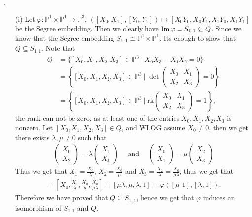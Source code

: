 \documentclass[12pt]{article}
\begin{document}
    \sol.
    \begin{enumerate}
        \item[(i)] Let $\varphi : \mathbb{P}^1 \times \mathbb{P}^1 \to \mathbb{P}^3$, $([X_0,X_1],[Y_0,Y_1]) \mapsto [X_0Y_0, X_0Y_1, X_1Y_0, X_1Y_1]$ be the Segree embedding. Then we clearly have $\operatorname{Im} \varphi = S_{1,1} \subseteq Q$. Since we know that the Segree embedding $S_{1,1} \cong \mathbb{P}^1 \times \mathbb{P}^1$. Its enough to show that $Q \subseteq S_{1,1}$. Note that 
        \begin{align*}
            Q &= \{ [X_0,X_1,X_2,X_3] \in \mathbb{P}^3 \mid X_0X_3 - X_1X_2 = 0 \} \\
            &= \left\{ [X_0,X_1,X_2,X_3] \in \mathbb{P}^3 \mid \det\begin{pmatrix} X_0 & X_1 \\ X_2 & X_3 \end{pmatrix} = 0\right\} \\ 
            &= \left\{ [X_0,X_1,X_2,X_3] \in \mathbb{P}^3 \mid \mathrm{rk}\begin{pmatrix} X_0 & X_1 \\ X_2 & X_3 \end{pmatrix} = 1 \right\},
        \end{align*}
        the rank can not be zero, as at least one of the entries $X_0, X_1, X_2, X_3$ is nonzero. Let $[X_0,X_1,X_2,X_3] \in Q$, and WLOG assume $X_0 \neq 0$, then we get there exists $\lambda, \mu \neq 0$ such that 
        \begin{align*}
            \begin{pmatrix}
                X_0 \\ X_2
            \end{pmatrix} = \lambda \begin{pmatrix}
                X_1 \\ X_3
            \end{pmatrix}  \quad \mbox{ and } \quad \begin{pmatrix}
                X_0 \\ X_1
            \end{pmatrix} = \mu \begin{pmatrix}
                X_2 \\ X_3
            \end{pmatrix}
        \end{align*} 
        Thus we get that $X_1 = \frac{X_0}{\lambda}$, $X_2 = \frac{X_0}{\mu}$ and $X_3 = \frac{X_2}{\lambda} = \frac{X_0}{\mu\lambda}$, thus we get that 
        \begin{align*}
            [X_0,X_1,X_2,X_3] = \left[ X_0, \frac{X_0}{\lambda}, \frac{X_0}{\mu}, \frac{X_0}{\mu\lambda} \right] = [\mu\lambda,\mu,\lambda,1] = \varphi([\mu,1],[\lambda,1]).
        \end{align*}
        Therefore we have proved that $Q \subseteq S_{1,1}$, hence we get that $\varphi$ induces an isomorphism of $S_{1,1}$ and $Q$. 
    

\end{enumerate}
\end{document}
